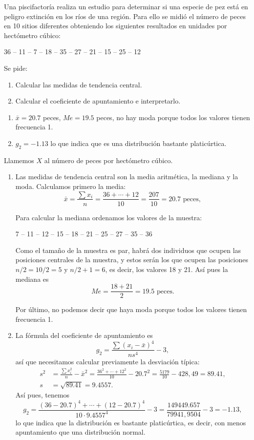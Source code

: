 {Una piscifactoría realiza un estudio para determinar si una especie de pez está en peligro extinción en los ríos de una región.
Para ello se midió el número de peces en 10 sitios diferentes obteniendo los siguientes resultados en unidades
por hectómetro cúbico:
\begin{center}
  36 -- 11 -- 7 -- 18 -- 35 -- 27 -- 21 -- 15 -- 25 -- 12
\end{center}
Se pide:
\begin{enumerate}
\item Calcular las medidas de tendencia central.
\item Calcular el coeficiente de apuntamiento e interpretarlo.
\end{enumerate}
}
{\begin{enumerate}
\item $\bar{x} = 20.7$ peces, $Me=19.5$ peces, no hay moda porque todos los valores tienen frecuencia 1. 
\item $g_2= -1.13$ lo que indica que es una distribución bastante platicúrtica. 
\end{enumerate}
}
{Llamemos $X$ al número de peces por hectómetro cúbico.
\begin{enumerate}
\item Las medidas de tendencia central son la media aritmética, la mediana y la moda. Calculamos primero la media:
\[
\bar{x} = \frac{\sum x_{i}}{n}=\frac{36+\cdots+12}{10}=\frac{207}{10}=20.7 \mbox{ peces},
\]

Para calcular la mediana ordenamos los valores de la muestra:
\begin{center}
  7 -- 11 -- 12 -- 15 -- 18 -- 21 -- 25 -- 27 -- 35 -- 36
\end{center}
Como el tamaño de la muestra es par, habrá dos individuos que ocupen las posiciones centrales de la muestra, y estos serán los que ocupen las posiciones $n/2=10/2=5$ y $n/2+1=6$, es decir, los valores 18 y 21. Así pues la mediana es
\[
Me=\frac{18+21}{2}=19.5 \mbox{ peces}.
\]

Por último, no podemos decir que haya moda porque todos los valores tienen frecuencia 1.

\item La fórmula del coeficiente de apuntamiento es 
\[
g_2=\frac{\sum (x_i-\bar{x})^4}{ns^4}-3,
\]
así que necesitamos calcular previamente la desviación típica:
\begin{align*}
s^2 & = \frac{\sum x_{i}^2}{n}-\bar{x}^2 =
\frac{36^2+\cdots+12^2}{10}-20.7^2=\frac{5179}{10}-428,49=89.41,\\
s &=\sqrt{89.41}=9.4557.
\end{align*}
Así pues, tenemos
\[
g_2=\frac{(36-20.7)^4+\cdots + (12-20.7)^4}{10\cdot 9.4557^4}-3=\frac{149449.657}{79941,9504}-3=-1.13,
\]
lo que indica que la distribución es bastante platicúrtica, es decir, con menos apuntamiento que una distribución normal.
\end{enumerate}
}



